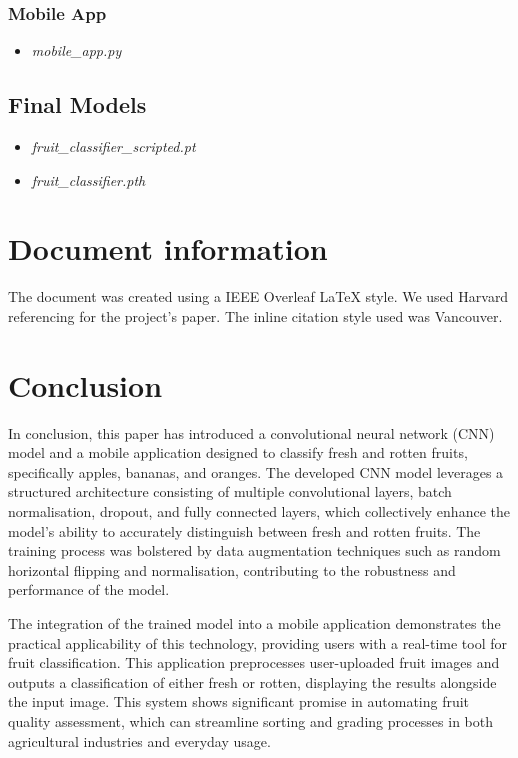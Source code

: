 \documentclass[conference]{IEEEtran}
\begin{document}
\subsubsection{Mobile App}
\begin{itemize}
    \item \textit{mobile\_app.py}
\end{itemize}

\subsection{Final Models}
\begin{itemize}
    \item \textit{fruit\_classifier\_scripted.pt}
    \item \textit{fruit\_classifier.pth}
\end{itemize}

\section{Document information}
The document was created using a IEEE Overleaf LaTeX style.  We used Harvard referencing for the project's paper. The inline citation style used was Vancouver.



\section{Conclusion}

In conclusion, this paper has introduced a convolutional neural network (CNN) model and a mobile application designed to classify fresh and rotten fruits, specifically apples, bananas, and oranges. The developed CNN model leverages a structured architecture consisting of multiple convolutional layers, batch normalisation, dropout, and fully connected layers, which collectively enhance the model's ability to accurately distinguish between fresh and rotten fruits. The training process was bolstered by data augmentation techniques such as random horizontal flipping and normalisation, contributing to the robustness and performance of the model.

The integration of the trained model into a mobile application demonstrates the practical applicability of this technology, providing users with a real-time tool for fruit classification. This application preprocesses user-uploaded fruit images and outputs a classification of either fresh or rotten, displaying the results alongside the input image. This system shows significant promise in automating fruit quality assessment, which can streamline sorting and grading processes in both agricultural industries and everyday usage.
\end{document}
